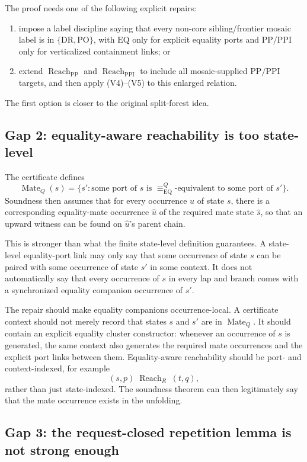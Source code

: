 \documentclass[11pt]{article}
\newcommand{\EQ}{\mathrm{EQ}}
\newcommand{\DR}{\mathrm{DR}}
\newcommand{\PO}{\mathrm{PO}}
\newcommand{\PP}{\mathrm{PP}}
\newcommand{\PPI}{\mathrm{PPI}}
\newcommand{\Reach}{\operatorname{Reach}}
\newcommand{\Mate}{\operatorname{Mate}}
\begin{document}
The proof needs one of the following explicit repairs:
\begin{enumerate}[label=(\alph*),leftmargin=*]
\item impose a label discipline saying that every non-core sibling/frontier mosaic label is in \(\{\DR,\PO\}\), with \(\EQ\) only for explicit equality ports and \(\PP/\PPI\) only for verticalized containment links; or
\item extend \(\Reach_{\PP}\) and \(\Reach_{\PPI}\) to include all mosaic-supplied \(\PP/\PPI\) targets, and then apply (V4)--(V5) to this enlarged relation.
\end{enumerate}
The first option is closer to the original split-forest idea.

\subsection{Gap 2: equality-aware reachability is too state-level}

The certificate defines
\[
\Mate_Q(s)=\{s' : \text{some port of }s\text{ is }\equiv^Q_{\EQ}\text{-equivalent to some port of }s'\}.
\]
Soundness then assumes that for every occurrence \(u\) of state \(s\), there is a corresponding equality-mate occurrence \(\hat u\) of the required mate state \(\hat s\), so that an upward witness can be found on \(\hat u\)'s parent chain.

This is stronger than what the finite state-level definition guarantees.  A state-level equality-port link may only say that some occurrence of state \(s\) can be paired with some occurrence of state \(s'\) in some context.  It does not automatically say that every occurrence of \(s\) in every lap and branch comes with a synchronized equality companion occurrence of \(s'\).

The repair should make equality companions occurrence-local.  A certificate context should not merely record that states \(s\) and \(s'\) are in \(\Mate_Q\).  It should contain an explicit equality cluster constructor: whenever an occurrence of \(s\) is generated, the same context also generates the required mate occurrences and the explicit port links between them.  Equality-aware reachability should be port- and context-indexed, for example
\[
(s,p)\;\Reach_R\;(t,q),
\]
rather than just state-indexed.  The soundness theorem can then legitimately say that the mate occurrence exists in the unfolding.

\subsection{Gap 3: the request-closed repetition lemma is not strong enough}
\end{document}
